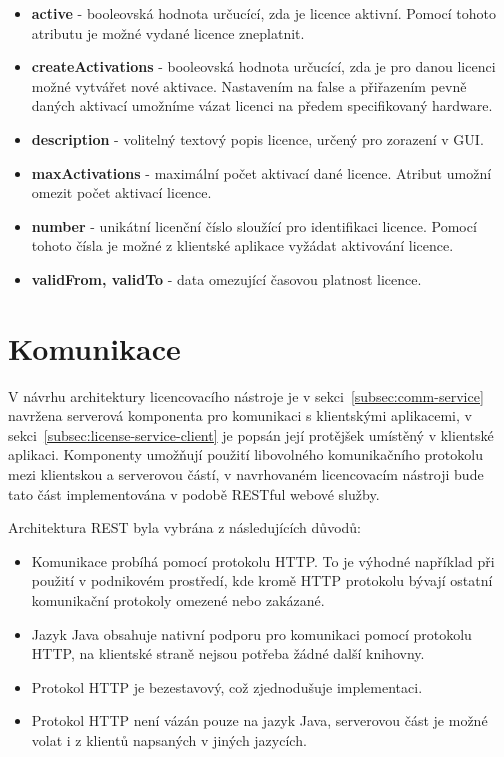 \begin{itemize}
  \item \textbf{active} - booleovská hodnota určucící, zda je licence aktivní.
  Pomocí tohoto atributu je možné vydané licence zneplatnit.
  \item \textbf{createActivations} - booleovská hodnota určucící, zda je pro
  danou licenci možné vytvářet nové aktivace. Nastavením na false a přiřazením
  pevně daných aktivací umožníme vázat licenci na předem specifikovaný hardware.
  \item \textbf{description} - volitelný textový popis licence, určený pro
  zorazení v \gls{GUI}.
  \item \textbf{maxActivations} - maximální počet aktivací dané licence. Atribut
  umožní omezit počet aktivací licence.
  \item \textbf{number} - unikátní licenční číslo sloužící pro identifikaci
  licence. Pomocí tohoto čísla je možné z klientské aplikace vyžádat aktivování
  licence.
  \item \textbf{validFrom, validTo} - data omezující časovou platnost licence.
\end{itemize}




\section{Komunikace}

V návrhu architektury licencovacího nástroje je v
sekci~\ref{subsec:comm-service} navržena serverová komponenta pro komunikaci s
klientskými aplikacemi, v sekci~\ref{subsec:license-service-client} je popsán
její protějšek umístěný v klientské aplikaci. Komponenty umožňují použití
libovolného komunikačního protokolu mezi klientskou a serverovou částí, v
navrhovaném licencovacím nástroji bude tato část implementována v podobě RESTful
webové služby.

Architektura \gls{REST} byla vybrána z následujících důvodů:
\begin{itemize}
  \item Komunikace probíhá pomocí protokolu \gls{HTTP}. To je výhodné například
  při použití v podnikovém prostředí, kde kromě \gls{HTTP} protokolu bývají
  ostatní komunikační protokoly omezené nebo zakázané.
  \item Jazyk Java obsahuje nativní podporu pro komunikaci pomocí protokolu
  \gls{HTTP}, na klientské straně nejsou potřeba žádné další knihovny.
  \item Protokol \gls{HTTP} je bezestavový, což zjednodušuje implementaci.
  \item Protokol \gls{HTTP} není vázán pouze na jazyk Java, serverovou část je
  možné volat i z klientů napsaných v jiných jazycích.
\end{itemize}

